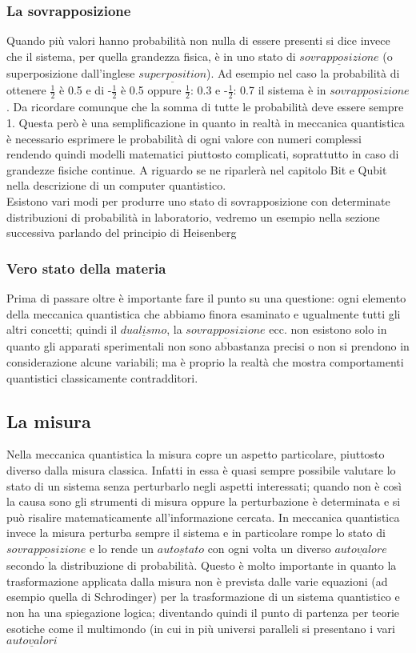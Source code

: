 \subsubsection{La sovrapposizione}
Quando più valori hanno probabilità non nulla di essere presenti si dice invece che il sistema, per quella grandezza fisica, è in uno stato di $\underline{sovrapposizione}$ (o superposizione dall'inglese $\underline{superposition}$). Ad esempio nel caso la probabilità di ottenere $\frac{1}{2}$ è 0.5 e di -$\frac{1}{2}$ è 0.5 oppure $\frac{1}{2}$: 0.3 e -$\frac{1}{2}$: 0.7 il sistema è in $\underline{sovrapposizione}$. Da ricordare comunque che la somma di tutte le probabilità deve essere sempre 1. Questa però è una semplificazione in quanto in realtà in meccanica quantistica è necessario esprimere le probabilità di ogni valore con numeri complessi rendendo quindi modelli matematici piuttosto complicati, soprattutto in caso di grandezze fisiche continue. A riguardo se ne riparlerà nel capitolo Bit e Qubit nella descrizione di un computer quantistico.\\
Esistono vari modi per produrre uno stato di sovrapposizione con determinate distribuzioni di probabilità in laboratorio, vedremo un esempio nella sezione successiva parlando del principio di Heisenberg
\subsubsection{Vero stato della materia}
Prima di passare oltre è importante fare il punto su una questione:
ogni elemento della meccanica quantistica che abbiamo finora esaminato e ugualmente tutti gli altri concetti; quindi il $\underline{dualismo}$, la $\underline{sovrapposizione}$ ecc. non esistono solo in quanto gli apparati sperimentali non sono abbastanza precisi o non si prendono in considerazione alcune variabili; ma è proprio la realtà che mostra comportamenti quantistici classicamente contradditori.
\subsection{La misura}
Nella meccanica quantistica la misura copre un aspetto particolare, piuttosto diverso dalla misura classica.
Infatti in essa è quasi sempre possibile valutare lo stato di un sistema senza perturbarlo negli aspetti interessati; quando non è così la causa sono gli strumenti di misura oppure la perturbazione è determinata e si può risalire matematicamente all'informazione cercata.
In meccanica quantistica invece la misura perturba sempre il sistema e in particolare rompe lo stato di $\underline{sovrapposizione}$ e lo rende un $\underline{autostato}$ con ogni volta un diverso $\underline{autovalore}$ secondo la distribuzione di probabilità.
Questo è molto importante in quanto la trasformazione applicata dalla misura non è prevista dalle varie equazioni (ad esempio quella di Schrodinger) per la trasformazione di un sistema quantistico e non ha una spiegazione logica; diventando quindi il punto di partenza per teorie esotiche come il multimondo (in cui in più universi paralleli si presentano i vari $\underline{autovalori}$
